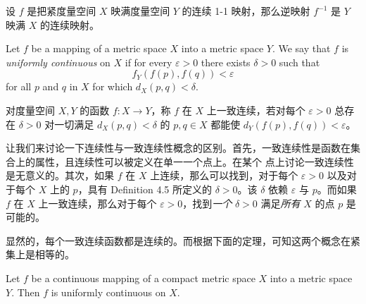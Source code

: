 \documentclass[../poma-notes.tex]{subfiles}
\begin{document}
\begin{anote}
  设 $f$ 是把紧度量空间 $X$ 映满度量空间 $Y$ 的连续 1-1 映射，那么逆映射 $f^{-1}$ 是 $Y$ 映满 $X$ 的连续映射。
\end{anote}

\begin{definition}
  Let $f$ be a mapping of a metric space $X$ into a metric space $Y$. We say that $f$ is \textit{uniformly
    continuous} on $X$ if for every $\varepsilon > 0$ there exists $\delta > 0$ such that
  \begin{equation}
    f_Y(f(p),f(q)) < \varepsilon
  \end{equation}
  for all $p$ and $q$ in $X$ for which $d_X(p,q) < \delta$.
\end{definition}

\begin{anote}
  对度量空间 $X, Y$ 的函数 $f: X \to Y$，称 $f$ 在 $X$ 上一致连续，若对每个 $\varepsilon > 0$ 总存在 $\delta > 0$
  对一切满足 $d_X(p,q) < \delta$ 的 $p, q \in X$ 都能使 $d_Y(f(p), f(q)) < \varepsilon$。
\end{anote}

让我们来讨论一下连续性与一致连续性概念的区别。首先，一致连续性是函数在集合上的属性，且连续性可以被定义在单一一个点上。在某个
点上讨论一致连续性是无意义的。其次，如果 $f$ 在 $X$ 上连续，那么可以找到，对于每个 $\varepsilon > 0$ 以及对于每个 $X$
上的 $p$，具有 Definition 4.5 所定义的 $\delta > 0$。该 $\delta$ 依赖 $\varepsilon$ 与 $p$。而如果 $f$ 在 $X$
上一致连续，那么对于每个 $\varepsilon > 0$，找到\textit{一个} $\delta > 0$ 满足\textit{所有} $X$ 的点 $p$ 是可能的。

显然的，每个一致连续函数都是连续的。而根据下面的定理，可知这两个概念在紧集上是相等的。

\begin{theorem}
  Let $f$ be a continuous mapping of a compact metric space $X$ into a metric space $Y$. Then $f$ is
  uniformly continuous on $X$.
\end{theorem}
\end{document}
